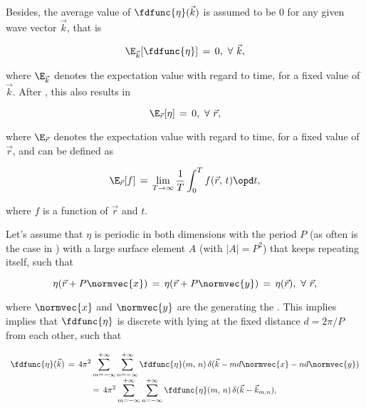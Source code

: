 {Besides, the average value of $\fdfunc{\eta}(\vec{k})$ is assumed to be 0 for any given wave vector $\vec{k}$, that is

\begin{equation} \label{eq:zero_expectation_value_reciprocal_space}
\E_{\vec{k}}[\fdfunc{\eta}] \,=\, 0,\ \forall\ \vec{k},
\end{equation}

where $\E_{\vec{k}}$ denotes the expectation value with regard to time, for a fixed value of $\vec{k}$. After , this also results in 

\begin{equation} \label{eq:zero_expectation_value_real_space_with_regard_to_t}
\E_{\vec{r}}[\eta] \,=\, 0,\ \forall\ \vec{r},
\end{equation}

where $\E_{\vec{r}}$ denotes the expectation value with regard to time, for a fixed value of $\vec{r}$, and can be defined as

\begin{equation} \label{eq:expectation_value_with_regard_to_t_definition}
\E_{\vec{r}}[f] \,=\, \lim_{T\to\infty}\frac{1}{T}\int_0^T f(\vec{r},\,t)\opd t,
\end{equation}

where $f$ is a function of $\vec{r}$ and $t$.

Let's assume that $\eta$ is periodic in both dimensions with the period $P$ (as often is the case in ) with a large surface element $A$ (with \mbox{$|A| = P^2$}) that keeps repeating itself, such that

\begin{equation} \label{eq:water_surface_periodicity}
\eta(\vec{r}+P\normvec{x}) \,=\, \eta(\vec{r}+P\normvec{y}) \,=\, \eta(\vec{r}),\ \forall\ \vec{r},
\end{equation}

where $\normvec{x}$ and $\normvec{y}$ are the  generating the . This implies implies that $\fdfunc{\eta}$ is discrete with  lying at the fixed distance $d = 2\pi/P$ from each other, such that

\begin{equation} \label{eq:fd_eta_series}
\renewcommand*{\arraystretch}{2}
\begin{array}{c}
\displaystyle \fdfunc{\eta}(\vec{k}) \,=\, 4\pi^2\sum_{m=-\infty}^{+\infty}\sum_{n=-\infty}^{+\infty} \fdfunc{\eta}(m,\,n)\,\delta(\vec{k} - md\normvec{x} - nd\normvec{y}) \\
\displaystyle =\, 4\pi^2\sum_{m=-\infty}^{+\infty}\sum_{n=-\infty}^{+\infty} \fdfunc{\eta}(m,\,n)\,\delta(\vec{k} - \vec{k}_{m,n}),
\end{array}
\end{equation}

}
